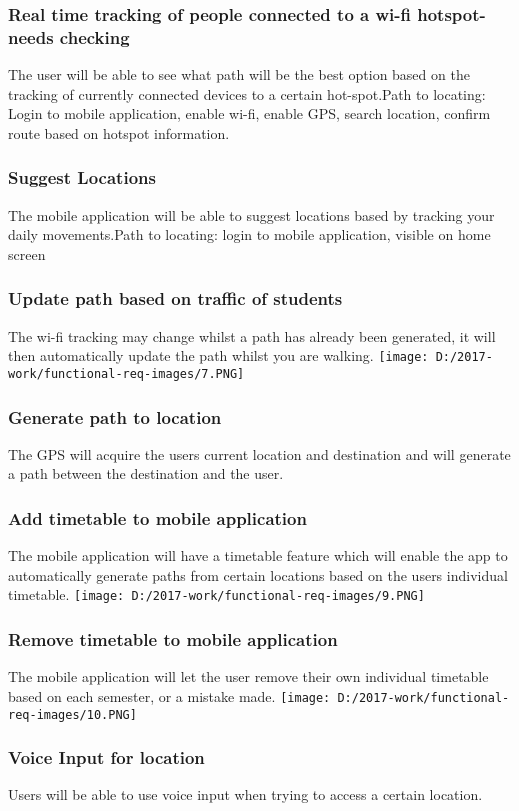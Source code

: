 \documentclass{article}
\begin{document}
\begin{center}
\subsubsection{Real time tracking of people connected to a wi-fi hotspot-needs checking}
The user will be able to see what path will be the best option based on the tracking of currently connected devices to a certain hot-spot.Path to locating: Login to mobile application, enable wi-fi, enable GPS, search location, confirm route based on hotspot information.
\newpage
\subsubsection{Suggest Locations}
The mobile application will be able to suggest locations based by tracking your daily movements.Path to locating: login to mobile application, visible on home screen
\subsubsection{Update path based on traffic of students}
The wi-fi tracking may change whilst a path has already been generated, it will then automatically update the path whilst you are walking.
\texttt{[image: D:/2017-work/functional-req-images/7.PNG]}
\newpage
\subsubsection{Generate path to location}
The GPS will acquire the users current location and destination and will generate a path between the destination and the user.

\subsubsection{Add timetable to mobile application}
The mobile application will have a timetable feature which will enable the app to automatically generate paths from certain locations based on the users individual timetable. 
\texttt{[image: D:/2017-work/functional-req-images/9.PNG]}
\newpage
\subsubsection{Remove timetable to mobile application}
The mobile application will let the user remove their own individual timetable based on each semester, or a mistake made.
\texttt{[image: D:/2017-work/functional-req-images/10.PNG]}
\newpage
\subsubsection{Voice Input for location}
Users will be able to use voice input when trying to access a certain location.

\end{center}
\end{document}
